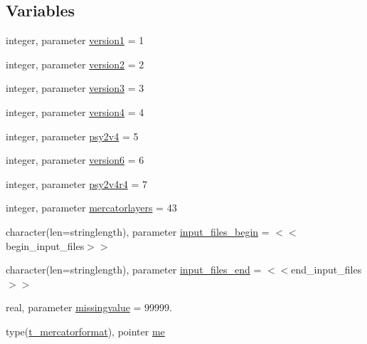 \subsection*{Variables}
\begin{DoxyCompactItemize}
\item 
integer, parameter \mbox{\hyperlink{namespacemodulemercatorformat_afd6a3e2f81f1b7519f09679d2a4b32a5}{version1}} = 1
\item 
integer, parameter \mbox{\hyperlink{namespacemodulemercatorformat_a62b4e03129d00d015ecc68be8b08abc0}{version2}} = 2
\item 
integer, parameter \mbox{\hyperlink{namespacemodulemercatorformat_a36f57d98299ecea5041ccb957b845703}{version3}} = 3
\item 
integer, parameter \mbox{\hyperlink{namespacemodulemercatorformat_ac816ec8a0895c280424703834af59eae}{version4}} = 4
\item 
integer, parameter \mbox{\hyperlink{namespacemodulemercatorformat_a5cabeaba108a40c83eac8f53a160106f}{psy2v4}} = 5
\item 
integer, parameter \mbox{\hyperlink{namespacemodulemercatorformat_ade9a7add1396b3abaf38515d54b29c3a}{version6}} = 6
\item 
integer, parameter \mbox{\hyperlink{namespacemodulemercatorformat_a033048289283175ff5dbfdcc172a4949}{psy2v4r4}} = 7
\item 
integer, parameter \mbox{\hyperlink{namespacemodulemercatorformat_a7bfebe3c1bfb641a6fcfbee0b393ba66}{mercatorlayers}} = 43
\item 
character(len=stringlength), parameter \mbox{\hyperlink{namespacemodulemercatorformat_af90631169c39b6d088c77e6f297ec8dc}{input\+\_\+files\+\_\+begin}} = \textquotesingle{}$<$$<$begin\+\_\+input\+\_\+files$>$$>$\textquotesingle{}
\item 
character(len=stringlength), parameter \mbox{\hyperlink{namespacemodulemercatorformat_ae3f030fbb07cb4b74b032f395b9e7482}{input\+\_\+files\+\_\+end}} = \textquotesingle{}$<$$<$end\+\_\+input\+\_\+files$>$$>$\textquotesingle{}
\item 
real, parameter \mbox{\hyperlink{namespacemodulemercatorformat_a091a5b0220afeb3dc3af915b1287f4f3}{missingvalue}} = 99999.
\item 
type(\mbox{\hyperlink{structmodulemercatorformat_1_1t__mercatorformat}{t\+\_\+mercatorformat}}), pointer \mbox{\hyperlink{namespacemodulemercatorformat_a1749fccffa78db7b38124dc3676b5e7e}{me}}
\end{DoxyCompactItemize}


